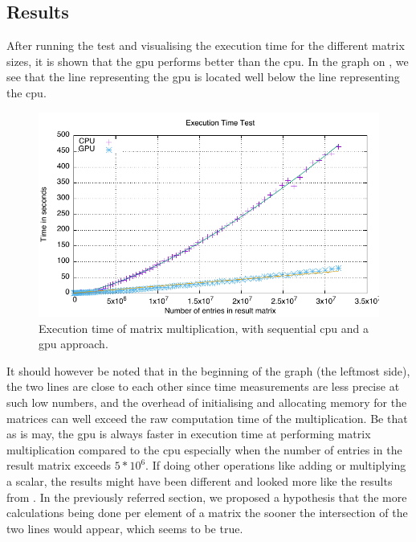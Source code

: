 \subsection{Results} %
\label{sub:results}
After running the test and visualising the execution time for the different matrix sizes, it is shown that the \acrshort{gpu} performs better than the \acrshort{cpu}.
In the graph on , we see that the line representing the \acrshort{gpu} is located well below the line representing the \acrshort{cpu}.
\begin{figure}[h]
    \centering
    \includegraphics{figures/tests/graph.pdf}
    \caption{Execution time of matrix multiplication, with sequential \acrshort{cpu} and a \acrshort{gpu} approach.}\label{fig:test_results}
\end{figure}
It should however be noted that in the beginning of the graph (the leftmost side), the two lines are close to each other since time measurements are less precise at such low numbers, and the overhead of initialising and allocating memory for the matrices can well exceed the raw computation time of the multiplication.
Be that as is may, the \acrshort{gpu} is always faster in execution time at performing matrix multiplication compared to the \acrshort{cpu} especially when the number of entries in the result matrix exceeds $5*10^6$.
If doing other operations like adding or multiplying a scalar, the results might have been different and looked more like the results from .
In the previously referred section, we proposed a hypothesis that the more calculations being done per element of a matrix the sooner the intersection of the two lines would appear, which seems to be true.


